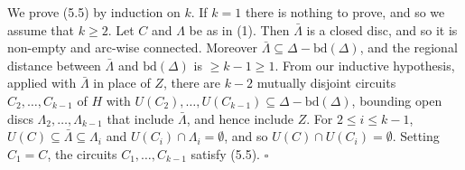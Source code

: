 {We prove (5.5) by induction on $k$. If $k = 1$ there is nothing to prove, and so we assume that $k \ge 2$. Let $C$ and $\Lambda$ be as in (1). Then $\bar{\Lambda}$ is a closed disc, and so it is non-empty and arc-wise connected. Moreover $\bar{\Lambda} \subseteq \Delta - \text{bd}(\Delta)$, and the regional distance between $\bar{\Lambda}$ and $\text{bd}(\Delta)$ is $\ge k - 1 \ge 1$. From our inductive hypothesis, applied with $\bar{\Lambda}$ in place of $Z$, there are $k - 2$ mutually disjoint circuits $C_2, \dots, C_{k-1}$ of $H$ with $U(C_2), \dots, U(C_{k-1}) \subseteq \Delta - \text{bd}(\Delta)$, bounding open discs $\Lambda_2, \dots, \Lambda_{k-1}$ that include $\bar{\Lambda}$, and hence include $Z$. For $2 \le i \le k - 1$, $U(C) \subseteq \bar{\Lambda} \subseteq \Lambda_i$ and $U(C_i) \cap \Lambda_i = \emptyset$, and so $U(C) \cap U(C_i) = \emptyset$. Setting $C_1 = C$, the circuits $C_1, \dots, C_{k-1}$ satisfy (5.5). $\square$}
